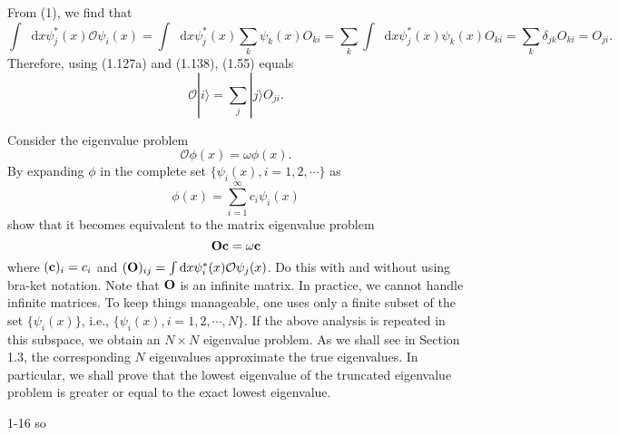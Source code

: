 \documentclass[a4paper]{book}
\newcounter{exercise}[chapter]
\newcounter{solution}[chapter]
\newcommand*{\dif}{\mathop{}\!\mathrm{d}}
\newcommand{\Op}{{\bf O}}
\begin{document}
	\begin{solution}
	
	From (1), we find that
	\[
		\int \dif x \psi^*_j(x) \mathscr{O} \psi_i(x) = \int \dif x \psi^*_j(x) \sum_{k} \psi_k(x) O_{ki} = \sum_{k} \int \dif x \psi^*_j(x) \psi_k(x) O_{ki} = \sum_{k} \delta_{jk} O_{ki} = O_{ji} .
	\]
	Therefore, using (1.127a) and (1.138), (1.55) equals
	\[
		\mathscr{O} | i \rangle = \sum_j | j \rangle O_{ji} .
	\]
	
	\end{solution}	
	
	\begin{exercise}
	Consider the eigenvalue problem
	\begin{equation}
		\mathcal{O} \phi(x) = \omega \phi(x).
	\end{equation}
	By expanding $\phi$ in the complete set $\{\psi_i(x),i=1,2,\cdots\}$ as
	\begin{equation*}
		\phi(x) = \sum_{i=1}^\infty c_i \psi_i(x)
	\end{equation*}
	show that it becomes equivalent to the matrix eigenvalue problem
	\begin{equation*}
		\Op {\bf c} = \omega {\bf c}
	\end{equation*}
	where $({\bf c})_i=c_i$ and $({\bf O})_{ij} = \int \dif x \psi^*_i(x)\mathcal{O}\psi_j(x)$. Do this with and without using bra-ket notation. Note that $\Op$ is an infinite matrix. In practice, we cannot handle infinite matrices. To keep things manageable, one uses only a finite subset of the set $\{\psi_i(x)\}$, i.e., $\{\psi_i(x),i=1,2,\cdots, N\}$. If the above analysis is repeated in this subspace, we obtain an $N \times N$ eigenvalue problem. As we shall see in Section 1.3, the corresponding $N$ eigenvalues approximate the true eigenvalues. In particular, we shall prove that the lowest eigenvalue of the truncated eigenvalue problem is greater or equal to the exact lowest eigenvalue.
	\end{exercise}
	
	\begin{solution}
		1-16 so
	\end{solution}
	
\end{document}
